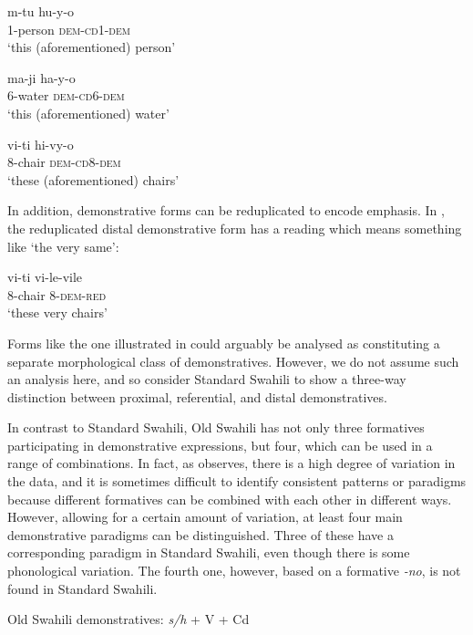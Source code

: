 \documentclass[output=paper]{langscibook}
\begin{document}
    \ea\label{ex:marten:11a} \gll   m-tu      hu-y-o \\
    1-person    \textsc{dem}{}-\textsc{cd}1-\textsc{dem}\\
    \glt ‘this (aforementioned) person’

    \ex\label{ex:marten:11b} \gll   ma-ji      ha-y-o\\
    6-water    \textsc{dem}{}-\textsc{cd}6-\textsc{dem}\\
    \glt ‘this (aforementioned) water’

    \ex\label{ex:marten:11c} \gll  vi-ti      hi-vy-o  \\
      8-chair    \textsc{dem-cd}8-\textsc{dem}\\
    \glt ‘these (aforementioned) chairs’
    \z
\z

In addition, demonstrative forms can be reduplicated to encode emphasis. In , the reduplicated distal demonstrative form has a reading which means something like ‘the very same’:

\ea\label{ex:marten:12}
    \gll vi-ti      vi-le-vile\\
8-chair    8-\textsc{dem}{}-\textsc{red}\\

   \glt  ‘these very chairs’
\z

Forms like the one illustrated in  could arguably be analysed as constituting a separate morphological class of demonstratives. However, we do not assume such an analysis here, and so consider Standard Swahili to show a three-way distinction between proximal, referential, and distal demonstratives. 

In contrast to Standard Swahili, Old Swahili has not only three formatives participating in demonstrative expressions, but four, which can be used in a range of combinations. In fact, as \citet[137]{Miehe1979} observes, there is a high degree of variation in the data, and it is sometimes difficult to identify consistent patterns or paradigms because different formatives can be combined with each other in different ways. However, allowing for a certain amount of variation, at least four main demonstrative paradigms can be distinguished. Three of these have a corresponding paradigm in Standard Swahili, even though there is some phonological variation. The fourth one, however, based on a formative \textit{{}-no}, is not found in Standard Swahili. 

\ea\label{ex:marten:13}
Old Swahili demonstratives: \textit{s/h} + V + Cd
\end{document}
